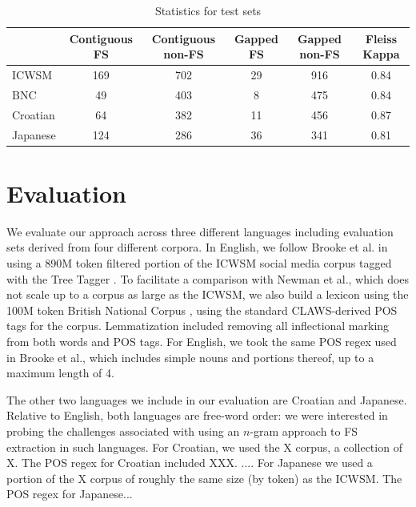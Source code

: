 \documentclass[11pt,letterpaper]{article}
\makeatletter
\def \al {al.\@ }
\makeatother
\begin{document}
\begin{table}[!bt]
 
 \begin{center}
  \caption{ Statistics for test sets}
	 \label{tab:stats}
	 \begin{tabular}{lccccc}

       \hline
			& Contiguous FS & Contiguous non-FS & Gapped FS & Gapped non-FS & Fleiss Kappa\\
			 \hline
			ICWSM & 169 & 702 & 29 & 916& 0.84 \\
			BNC & 49 & 403 & 8 & 475 & 0.84 \\
			Croatian & 64 & 382 & 11 & 456 & 0.87 \\
			Japanese & 124 & 286 & 36 & 341 & 0.81\\
       \hline
 \end{tabular}

 \end{center}

 \end{table}	

\section{Evaluation} \label{sec:evaluation}

We evaluate our approach across three different languages including evaluation sets derived from four different corpora. In English, we follow Brooke et \al {} in using a 890M token filtered portion of the ICWSM social media corpus \cite{ICWSM} tagged with the Tree Tagger \cite{Schmid95}. To facilitate a comparison with Newman et \al {}, which does not scale up to a corpus as large as the ICWSM, we also build a lexicon using the 100M token British National Corpus \cite{BNC}, using the standard CLAWS-derived POS tags for the corpus. Lemmatization included removing all inflectional marking from both words and POS tags. For English, we took the same POS regex used in Brooke et \al {}, which includes simple nouns and portions thereof, up to a maximum length of 4.

The other two languages we include in our evaluation are Croatian and Japanese. Relative to English, both languages are free-word order: we were interested in probing the challenges associated with using an $n$-gram approach to FS extraction in such languages. For Croatian, we used the X corpus, a collection of X. The POS regex for Croatian included XXX. .... For Japanese we used a portion of the X corpus of roughly the same size (by token) as the ICWSM. The POS regex for Japanese...
\end{document}
